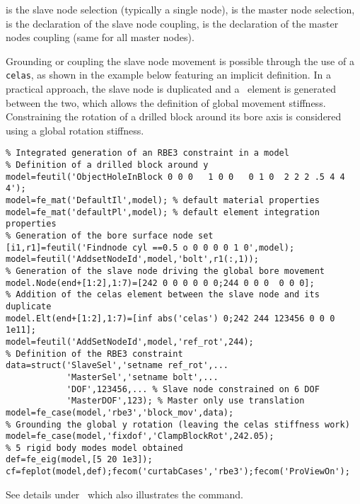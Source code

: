  is the slave node selection (typically a single node),  is the master node selection,  is the declaration of the slave node coupling,  is the declaration of the master nodes coupling (same for all master nodes).

Grounding or coupling the slave node movement is possible through the use of a {\tt celas}, as shown in the example below featuring an implicit  definition. In a practical approach, the slave node is duplicated and a \celas\ element is generated between the two, which allows the definition of global movement stiffness.  Constraining the rotation of a drilled block around its bore axis is considered using a global rotation stiffness.

\begin{verbatim}
% Integrated generation of an RBE3 constraint in a model
% Definition of a drilled block around y
model=feutil('ObjectHoleInBlock 0 0 0   1 0 0   0 1 0  2 2 2 .5 4 4 4'); 
model=fe_mat('DefaultIl',model); % default material properties
model=fe_mat('defaultPl',model); % default element integration properties
% Generation of the bore surface node set
[i1,r1]=feutil('Findnode cyl ==0.5 o 0 0 0 0 1 0',model);
model=feutil('AddsetNodeId',model,'bolt',r1(:,1));
% Generation of the slave node driving the global bore movement
model.Node(end+[1:2],1:7)=[242 0 0 0 0 0 0;244 0 0 0  0 0 0];
% Addition of the celas element between the slave node and its duplicate
model.Elt(end+[1:2],1:7)=[inf abs('celas') 0;242 244 123456 0 0 0 1e11];
model=feutil('AddSetNodeId',model,'ref_rot',244);
% Definition of the RBE3 constraint
data=struct('SlaveSel','setname ref_rot',...
            'MasterSel','setname bolt',...
            'DOF',123456,... % Slave node constrained on 6 DOF
            'MasterDOF',123); % Master only use translation
model=fe_case(model,'rbe3','block_mov',data);
% Grounding the global y rotation (leaving the celas stiffness work)
model=fe_case(model,'fixdof','ClampBlockRot',242.05);
% 5 rigid body modes model obtained
def=fe_eig(model,[5 20 1e3]);
cf=feplot(model,def);fecom('curtabCases','rbe3');fecom('ProViewOn');
\end{verbatim}%



See details under \rigid\ which also illustrates the  command.


